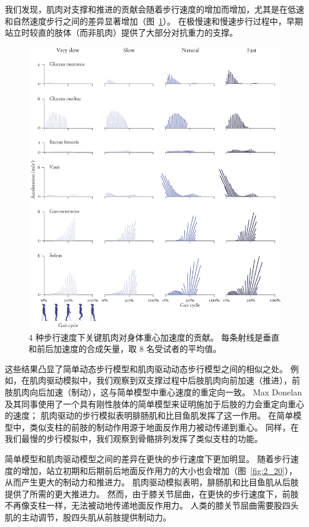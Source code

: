 我们发现，肌肉对支撑和推进的贡献会随着步行速度的增加而增加，尤其是在低速和自然速度步行之间的差异显著增加（图~\ref{fig:11_11}）。
在极慢速和慢速步行过程中，早期站立时较直的肢体（而非肌肉）提供了大部分对抗重力的支撑。


\begin{figure}[!htb]
	\centering
	\includegraphics[width=1.0\linewidth]{chap11/11_11}
	\caption{4 种步行速度下关键肌肉对身体重心加速度的贡献。
		每条射线是垂直和前后加速度的合成矢量，取 8 名受试者的平均值\cite{liu2008muscle}。 \label{fig:11_11}}
\end{figure}

这些结果凸显了简单动态步行模型和肌肉驱动动态步行模型之间的相似之处。
例如，在肌肉驱动模拟中，我们观察到双支撑过程中后肢肌肉向前加速（推进），前肢肌肉向后加速（制动），这与简单模型中重心速度的重定向一致。
Max Donelan 及其同事\cite{donelan2002mechanical}使用了一个具有刚性肢体的简单模型来证明施加于后肢的力会重定向重心的速度；
肌肉驱动的步行模拟表明腓肠肌和比目鱼肌发挥了这一作用。
在简单模型中，类似支柱的前肢的制动作用源于地面反作用力被动传递到重心\cite{kuo2002energetics}。
同样，在我们最慢的步行模拟中，我们观察到骨骼排列发挥了类似支柱的功能。


简单模型和肌肉驱动模型之间的差异在更快的步行速度下更加明显。
随着步行速度的增加，站立初期和后期前后地面反作用力的大小也会增加（图~\ref{fig:2_20}），从而产生更大的制动力和推进力。
肌肉驱动模拟表明，腓肠肌和比目鱼肌从后肢提供了所需的更大推进力。
然而，由于膝关节屈曲，在更快的步行速度下，前肢不再像支柱一样，无法被动地传递地面反作用力。
人类的膝关节屈曲需要股四头肌的主动调节，股四头肌从前肢提供制动力。


